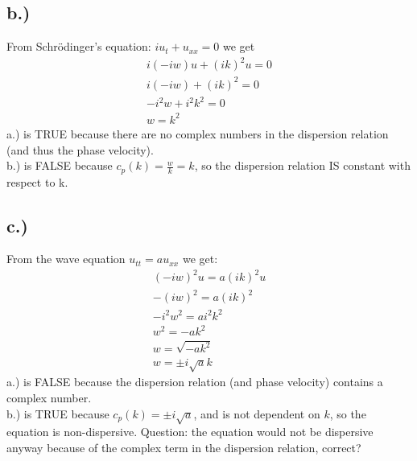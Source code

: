 \documentclass{article}
\begin{document}
\subsection*{b.)}
From Schr\"odinger's equation: $iu_t + u_{xx} = 0$ we get
\begin{equation}
\begin{aligned}
i(-iw)u + (ik)^2u = 0\\
i(-iw) + (ik)^2 = 0\\
-i^2w + i^2k^2 = 0\\
w = k^2
\end{aligned}
\end{equation}
a.) is TRUE because there are no complex numbers in the dispersion relation (and thus the phase velocity).\\
b.) is FALSE because $c_p(k) = \frac{w}{k} = k$, so the dispersion relation IS constant with respect to k.
\subsection*{c.)}
From the wave equation $u_{tt} = au_{xx}$ we get:
\begin{equation}
\begin{aligned}
(-iw)^2u = a(ik)^2u\\
-(iw)^2 = a(ik)^2\\
-i^2w^2 = ai^2k^2\\
w^2 = -ak^2\\
w = \sqrt{-ak^2}\\
w = \pm i\sqrt{a}k
\end{aligned}
\end{equation}
a.) is FALSE because the dispersion relation (and phase velocity) contains a complex number.\\
b.) is TRUE because $c_p(k) = \pm i\sqrt{a}$, and is not dependent on $k$, so the equation is non-dispersive. Question: the equation would not be dispersive anyway because of the complex term in the dispersion relation, correct?
\end{document}
